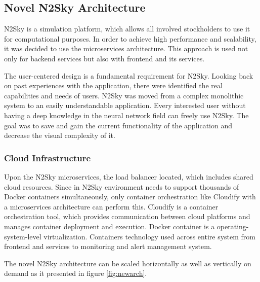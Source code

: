 \subsection{Novel N2Sky Architecture}\label{Contemporary N2Sky Architecture}

N2Sky is a simulation platform, which allows all involved stockholders to use it for computational purposes. In order to achieve high performance and scalability, it was decided to use the microservices architecture. This approach is used not only for backend services but also with frontend and its services.

The user-centered design is a fundamental requirement for N2Sky. Looking back on past experiences with the application, there were identified the real capabilities and needs of users. N2Sky was moved from a complex monolithic system to an easily understandable application. Every interested user without having a deep knowledge in the neural network field can freely use N2Sky.  The goal was to save and gain the current functionality of the application and decrease the visual complexity of it. 

\subsubsection{Cloud Infrastructure}\label{Cloud infrastructure}


Upon the N2Sky microservices, the load balancer located, which includes shared cloud resources. Since in N2Sky environment needs to support thousands of Docker containers \cite{docker} simultaneously, only container orchestration like Cloudify \cite{cloudify} with a microservices architecture can perform this.  Cloudify is a container orchestration tool, which provides communication between cloud platforms and manages container deployment and execution. Docker container is a operating-system-level virtualization. Containers technology used across entire system from frontend and services to monitoring and alert management system. 

The novel N2Sky architecture can be scaled horizontally as well as vertically on demand as it presented in figure \ref{fig:newarch}.

